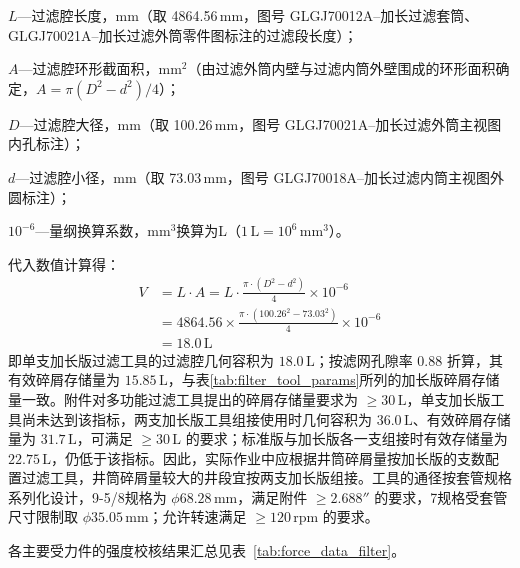 $L$---过滤腔长度，mm（取 4864.56\,mm，图号 GLGJ70012A--加长过滤套筒、GLGJ70021A--加长过滤外筒零件图标注的过滤段长度）；

$A$---过滤腔环形截面积，mm$^2$（由过滤外筒内壁与过滤内筒外壁围成的环形面积确定，$A=\pi(D^2-d^2)/4$）；

$D$---过滤腔大径，mm（取 100.26\,mm，图号 GLGJ70021A--加长过滤外筒主视图内孔标注）；

$d$---过滤腔小径，mm（取 73.03\,mm，图号 GLGJ70018A--加长过滤内筒主视图外圆标注）；

$10^{-6}$---量纲换算系数，mm$^3$换算为L（$1\,\text{L} = 10^6\,\text{mm}^3$）。

代入数值计算得：
\begin{equation}
    \begin{aligned}
        V &= L \cdot A = L \cdot \frac{\pi \cdot (D^2 - d^2)}{4} \times 10^{-6} \\
        &= 4864.56 \times \frac{\pi \cdot (100.26^2 - 73.03^2)}{4} \times 10^{-6} \\
        &= 18.0\,\text{L}
    \end{aligned}
\end{equation}
即单支加长版过滤工具的过滤腔几何容积为 $18.0\,\text{L}$；按滤网孔隙率 $0.88$ 折算，其有效碎屑存储量为 $15.85\,\text{L}$，与表\ref{tab:filter_tool_params}所列的加长版碎屑存储量一致。附件对多功能过滤工具提出的碎屑存储量要求为 $\ge 30\,\text{L}$，单支加长版工具尚未达到该指标，两支加长版工具组接使用时几何容积为 $36.0\,\text{L}$、有效碎屑存储量为 $31.7\,\text{L}$，可满足 $\ge 30\,\text{L}$ 的要求；标准版与加长版各一支组接时有效存储量为 $22.75\,\text{L}$，仍低于该指标。因此，实际作业中应根据井筒碎屑量按加长版的支数配置过滤工具，井筒碎屑量较大的井段宜按两支加长版组接。工具的通径按套管规格系列化设计，9-5/8\inch 规格为 $\phi 68.28$\,mm，满足附件 $\ge 2.688''$ 的要求，7\inch 规格受套管尺寸限制取 $\phi 35.05$\,mm；允许转速满足 $\ge 120$\,rpm 的要求。


各主要受力件的强度校核结果汇总见表~\ref{tab:force_data_filter}。

